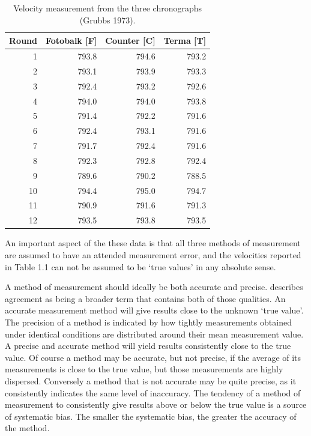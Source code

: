 \documentclass[12pt, a4paper]{report}
\theoremstyle{plain}
\theoremstyle{definition}
\theoremstyle{remark}
\begin{document}
	\begin{table}[ht]
		\begin{center}
			\begin{tabular}{rrrr}
				\hline
				Round& Fotobalk [F] & Counter [C]& Terma [T]\\
				\hline
				1 & 793.8 & 794.6 & 793.2 \\
				2 & 793.1 & 793.9 & 793.3 \\
				3 & 792.4 & 793.2 & 792.6 \\
				4 & 794.0 & 794.0 & 793.8 \\
				5 & 791.4 & 792.2 & 791.6 \\
				6 & 792.4 & 793.1 & 791.6 \\
				7 & 791.7 & 792.4 & 791.6 \\
				8 & 792.3 & 792.8 & 792.4 \\
				9 & 789.6 & 790.2 & 788.5 \\
				10 & 794.4 & 795.0 & 794.7 \\
				11 & 790.9 & 791.6 & 791.3 \\
				12 & 793.5 & 793.8 & 793.5 \\
				\hline
			\end{tabular}
			\caption{Velocity measurement from the three chronographs (Grubbs
				1973).}
		\end{center}
	\end{table}
	
	An important aspect of the these data is that all three methods of
	measurement are assumed to have an attended measurement error, and
	the velocities reported in Table 1.1 can not be assumed to be
	`true values' in any absolute sense.
	
	
	A method of measurement should ideally be both accurate and
	precise. \citet{Barnhart} describes agreement as being a broader
	term that contains both of those qualities. An accurate
	measurement method will give results close to the unknown `true
	value'. The precision of a method is indicated by how tightly
	measurements obtained under identical conditions are distributed
	around their mean measurement value. A precise and accurate method
	will yield results consistently close to the true value. Of course
	a method may be accurate, but not precise, if the average of its
	measurements is close to the true value, but those measurements
	are highly dispersed. Conversely a method that is not accurate may
	be quite precise, as it consistently indicates the same level of
	inaccuracy. The tendency of a method of measurement to
	consistently give results above or below the true value is a
	source of systematic bias. The smaller the systematic bias, the
	greater the accuracy of the method.
	
\end{document}
